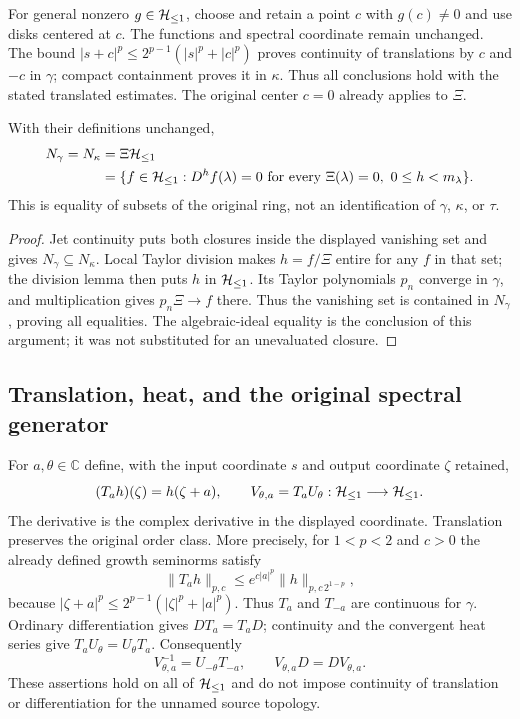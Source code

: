 For general nonzero $g\in\mathcal H_{\leq 1}$, choose and retain a point $c$ with
$g(c)\ne0$ and use disks centered at $c$. The functions and spectral
coordinate remain unchanged. The bound
$|s+c|^p\leq2^{p-1}(|s|^p+|c|^p)$ proves continuity of translations
by $c$ and $-c$ in $\gamma$; compact containment proves it in
$\kappa$. Thus all conclusions hold with the stated translated
estimates. The original center $c=0$ already applies to $\Xi$.

\begin{cqproposition}
\label{csq:thm-equalclosures}
With their definitions unchanged,
\begin{equation}\label{csq:eq-equalclosures}
 \begin{aligned}
 N_\gamma=N_\kappa&=\Xi\mathcal H_{\leq 1}\\
 &=\{f\in\mathcal H_{\leq 1}:D^hf(\lambda)=0\text{ for every }\Xi(\lambda)=0,
                                      \ 0\leq h<m_\lambda\}.
 \end{aligned}
\end{equation}
This is equality of subsets of the original ring, not an
identification of $\gamma$, $\kappa$, or $\tau$.
\end{cqproposition}
\begin{proof}
Jet continuity puts both closures inside the displayed vanishing
set and gives $N_\gamma\subseteq N_\kappa$. Local Taylor division
makes $h=f/\Xi$ entire for any $f$ in that set; the division lemma
then puts $h$ in $\mathcal H_{\leq 1}$. Its Taylor polynomials $p_n$ converge in
$\gamma$, and multiplication gives $p_n\Xi\to f$ there. Thus the
vanishing set is contained in $N_\gamma$, proving all equalities.
The algebraic-ideal equality is the conclusion of this argument;
it was not substituted for an unevaluated closure.
\end{proof}


\subsection{Translation, heat, and the original spectral generator}

For $a,\theta\in\mathbb C$ define, with the input coordinate $s$ and
output coordinate $\zeta$ retained,
\[
 (T_ah)(\zeta)=h(\zeta+a),\qquad
 V_{\theta,a}=T_aU_\theta:\mathcal H_{\leq 1}\longrightarrow\mathcal H_{\leq 1}.
\]
The derivative is the complex derivative in the displayed coordinate.
Translation preserves the original order class. More precisely, for
$1<p<2$ and $c>0$ the already defined growth seminorms satisfy
\[
 \|T_ah\|_{p,c}\leq
 e^{c|a|^p}\|h\|_{p,c\,2^{1-p}},
\]
because $|\zeta+a|^p\leq2^{p-1}(|\zeta|^p+|a|^p)$.
Thus $T_a$ and $T_{-a}$ are continuous for $\gamma$. Ordinary
differentiation gives $DT_a=T_aD$; continuity and the convergent
heat series give $T_aU_\theta=U_\theta T_a$. Consequently
\[
 V_{\theta,a}^{-1}=U_{-\theta}T_{-a},\qquad
 V_{\theta,a}D=DV_{\theta,a}.
\]
These assertions hold on all of $\mathcal H_{\leq 1}$ and do not impose continuity
of translation or differentiation for the unnamed source topology.

